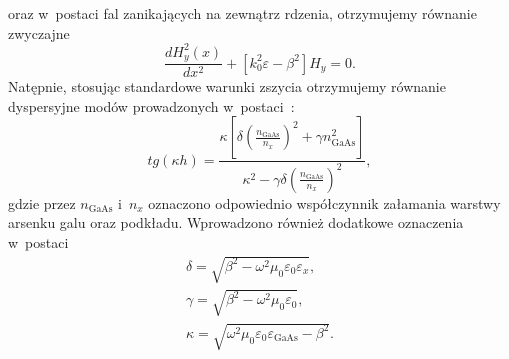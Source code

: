 oraz w~postaci fal zanikających na zewnątrz rdzenia, otrzymujemy równanie zwyczajne
\begin{equation}
	\frac{d H_y^2(x)}{dx^2} + [ k_0^2 \varepsilon - \beta^2 ] H_y = 0.
\end{equation}
Natępnie, stosując standardowe warunki zszycia otrzymujemy równanie dyspersyjne modów prowadzonych w~postaci~\cite{petykiewicz1989podstawy}:
\begin{equation}
tg( \kappa h)=\frac{\kappa [ \delta (\frac{n_{\textrm{GaAs}}}{n_x})^2 + \gamma n_{\textrm{GaAs}}^2 ]}{\kappa^2 - \gamma \delta (\frac{n_{\textrm{GaAs}}}{n_x })^2},
\label{eq:tm-disp}
\end{equation}
gdzie przez $n_{\textrm{GaAs}}$ i~$n_x$ oznaczono odpowiednio współczynnik załamania warstwy arsenku galu oraz podkładu. Wprowadzono również dodatkowe oznaczenia w~postaci
\begin{equation}
	\begin{gathered}
		\delta=\sqrt{\beta^2-\omega^2 \mu_0 \varepsilon_0 \varepsilon_x},\\
		\gamma=\sqrt{\beta^2-\omega^2 \mu_0 \varepsilon_0},\\
		\kappa=\sqrt{\omega^2 \mu_0 \varepsilon_0 \varepsilon_{\textrm{GaAs}} - \beta^2}.
	\end{gathered}
\end{equation}

